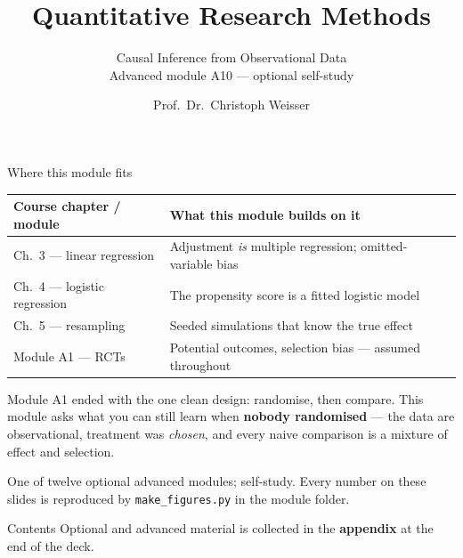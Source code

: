 \documentclass[aspectratio=169,11pt]{beamer}
\title{Quantitative Research Methods}
\subtitle{Causal Inference from Observational Data\\[2pt]{\small Advanced module A10 --- optional self-study}}
\author{Prof.\ Dr.\ Christoph Weisser}
\date{}\graphicspath{{images/}}
\begin{document}
\begin{frame}[plain]\titlepage\end{frame}

\begin{frame}{Where this module fits}
  \footnotesize
  \begin{center}
  \begin{tabular}{@{}p{3.9cm}p{8.4cm}@{}}
    \toprule
    \textbf{Course chapter / module} & \textbf{What this module builds on it} \\
    \midrule
    Ch.\ 3 --- linear regression & Adjustment \emph{is} multiple regression; omitted-variable bias \\
    Ch.\ 4 --- logistic regression & The propensity score is a fitted logistic model \\
    Ch.\ 5 --- resampling & Seeded simulations that know the true effect \\
    Module A1 --- RCTs & Potential outcomes, selection bias --- assumed throughout \\
    \bottomrule
  \end{tabular}
  \end{center}
  \vspace{2pt}
  \begin{takeaway}
    Module A1 ended with the one clean design: randomise, then compare. This module
    asks what you can still learn when \textbf{nobody randomised} --- the data are
    observational, treatment was \emph{chosen}, and every naive comparison is a
    mixture of effect and selection.
  \end{takeaway}
  {\scriptsize One of twelve optional advanced modules; self-study. Every number on
  these slides is reproduced by \texttt{make\_figures.py} in the module folder.}
\end{frame}

\begin{frame}{Contents}\small\tableofcontents[hideallsubsections]
  \vfill
  {\tiny Optional and advanced material is collected in the \textbf{appendix} at the end of the deck.}
\end{frame}
\end{document}
